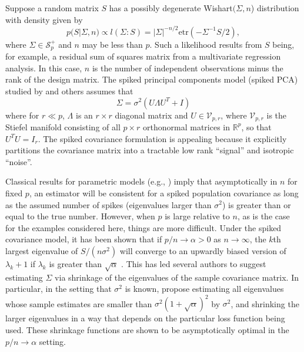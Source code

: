 \documentclass[12pt]{article}
\newcommand{\bl}[1]{{\mathbf #1}}
\newcommand{\etr}{\text{etr}}
\begin{document}
Suppose a random matrix $S$ has a possibly degenerate Wishart$(\Sigma,n$)
distribution with density given by
\begin{equation} 
p(S | \Sigma, n) \propto l(\Sigma: S) =  |\Sigma|^{-n/2} \text{etr}( - \Sigma^{-1}  S/2 ) ,  
\label{eqn:lik}
\end{equation}
%
\noindent where $\Sigma \in \mathcal S_p^+$ and $n$ may be less than $p$.  Such
a likelihood results from $S$ being, for example, a residual sum
of squares matrix from a multivariate regression analysis. In this
case, $n$ is the number of independent observations minus the rank of
the design matrix.  The spiked principal components model (spiked PCA)
studied by \citet{Johnstone2001} and others assumes that
\begin{equation} 
\Sigma = \sigma^2 ( U  \Lambda  U^T  + I )
\label{eqn:spiked}
\end{equation}
%
\noindent where for $r \ll p$, $\Lambda$ is an $r\times r$ diagonal
matrix and $U \in \mathcal V_{p,r}$, where $\mathcal V_{p,r}$ is the
Stiefel manifold consisting of all $p \times r$ orthonormal matrices in $\mathbb{R}^p$, so that
$U^TU = I_r$.  The spiked covariance formulation is appealing because it
explicitly partitions the covariance matrix into a tractable low rank
``signal'' and isotropic ``noise''.


Classical results for parametric models (e.g., \citet{Schwartz1965})
imply that asymptotically in $n$ for fixed $p$, an estimator will be
consistent for a spiked population covariance as long as the assumed
number of spikes (eigenvalues larger than $\sigma^2$) is greater than
or equal to the true number.  However, when $p$ is large relative to
$n$, as is the case for the examples considered here, things are more
difficult.  Under the spiked covariance model, it has been shown that
if $p/n \rightarrow \alpha >0$ as $n\rightarrow \infty$, the $k$th
largest eigenvalue of $S/(n\sigma^2)$ will converge to an upwardly
biased version of $\lambda_{k}+1$ if $\lambda_k$ is greater than
$\sqrt{\alpha}$ \citep{Baik2006, Paul2007}.  This has led several
authors to suggest estimating $\Sigma$ via shrinkage of the
eigenvalues of the sample covariance matrix. In particular, in the
setting that $\sigma^2$ is known, \citet{Donoho2013} propose
estimating all eigenvalues whose sample estimates are smaller than
$\sigma^2(1+\sqrt{\alpha})^2$ by $\sigma^2$, and shrinking the larger
eigenvalues in a way that depends on the particular loss function
being used.  These shrinkage functions are shown to be asymptotically
optimal in the $p/n\rightarrow \alpha$ setting.  
\end{document}
